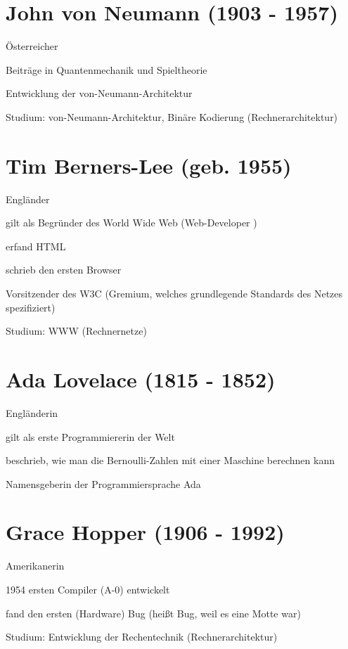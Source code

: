 \documentclass[a4paper,12pt]{report}
\begin{document}
\section*{John von Neumann (1903 - 1957)}
\begin{itemize*}
    \item Österreicher
    \item Beiträge in Quantenmechanik und Spieltheorie
    \item Entwicklung der von-Neumann-Architektur
    \item Studium: von-Neumann-Architektur, Binäre Kodierung (Rechnerarchitektur)
\end{itemize*}

\section*{Tim Berners-Lee (geb. 1955)}
\begin{itemize*}
    \item Engländer
    \item gilt als Begründer des World Wide Web (Web-Developer \Laughey)
    \item erfand HTML
    \item schrieb den ersten Browser
    \item Vorsitzender des W3C (Gremium, welches grundlegende Standards des Netzes
          spezifiziert)
    \item Studium: WWW (Rechnernetze)
\end{itemize*}

\newpage

\section*{Ada Lovelace (1815 - 1852)}
\begin{itemize*}
    \item Engländerin
    \item gilt als erste Programmiererin der Welt
    \item beschrieb, wie man die Bernoulli-Zahlen mit einer Maschine berechnen kann
    \item Namensgeberin der Programmiersprache Ada
\end{itemize*}

\section*{Grace Hopper (1906 - 1992)}
\begin{itemize*}
    \item Amerikanerin
    \item 1954 ersten Compiler (A-0) entwickelt
    \item fand den ersten (Hardware) Bug (heißt Bug, weil es eine Motte war)
    \item Studium: Entwicklung der Rechentechnik (Rechnerarchitektur)
\end{itemize*}
\end{document}

